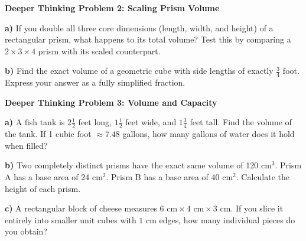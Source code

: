 \documentclass[12pt, letterpaper, fleqn]{article}
\begin{document}
\vspace{5mm}

\begin{tcolorbox}[colback=white, colframe=black, boxrule=1pt, arc=4mm, left=6mm, right=6mm, top=5mm, bottom=5mm]
\textbf{Deeper Thinking Problem 2: Scaling Prism Volume}

\medskip
\noindent
\textbf{a)} If you double all three core dimensions (length, width, and height) of a rectangular prism, what happens to its total volume? Test this by comparing a $2 \times 3 \times 4$ prism with its scaled counterpart.
\vspace{3cm}

\noindent
\textbf{b)} Find the exact volume of a geometric cube with side lengths of exactly $\frac{3}{4}$ foot. Express your answer as a fully simplified fraction.
\vspace{3cm}
\end{tcolorbox}

\newpage

\begin{tcolorbox}[colback=white, colframe=black, boxrule=1pt, arc=4mm, left=6mm, right=6mm, top=5mm, bottom=5mm]
\textbf{Deeper Thinking Problem 3: Volume and Capacity}

\medskip
\noindent
\textbf{a)} A fish tank is $2\frac{1}{2}$ feet long, $1\frac{1}{2}$ feet wide, and $1\frac{3}{4}$ feet tall. Find the volume of the tank. If 1 cubic foot $\approx 7.48$ gallons, how many gallons of water does it hold when filled?
\vspace{5cm}

\noindent
\textbf{b)} Two completely distinct prisms have the exact same volume of 120 cm$^3$. Prism A has a base area of 24 cm$^2$. Prism B has a base area of 40 cm$^2$. Calculate the height of each prism.
\vspace{5cm}

\noindent
\textbf{c)} A rectangular block of cheese measures $6\text{ cm} \times 4\text{ cm} \times 3\text{ cm}$. If you slice it entirely into smaller unit cubes with $1\text{ cm}$ edges, how many individual pieces do you obtain?
\vspace{5cm}
\end{tcolorbox}

\vspace{5mm}
\end{document}
